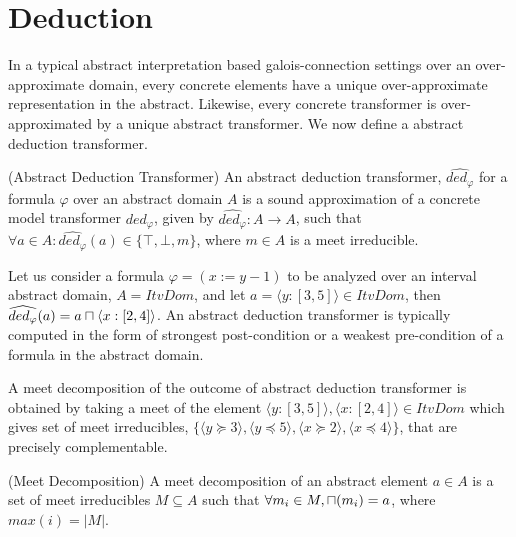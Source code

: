 \section{Deduction}
In a typical abstract interpretation based galois-connection settings over 
an over-approximate domain, every concrete elements have a unique over-approximate 
representation in the abstract.  Likewise, every concrete transformer is
over-approximated by a unique abstract transformer.  We now define a abstract 
deduction transformer.  

\begin{definition}{(Abstract Deduction Transformer)} An abstract deduction
transformer, $\widehat{ded_{\varphi}}$ for a formula $\varphi$ over an abstract 
domain $A$ is a sound approximation of a concrete model transformer
$ded_{\varphi}$, given by $\widehat{ded_{\varphi}} : A \rightarrow A$, such that 
$\forall a \in A: \widehat{ded_{\varphi}}(a) \in \{\top, \bot, m\}$, where 
$m \in A$ is a meet irreducible.   
\end{definition}

Let us consider a formula $\varphi = (x:=y-1)$ to be analyzed over 
an interval abstract domain, $A = ItvDom$, and let $a = \langle y:[3, 5]
\rangle \in ItvDom$, then $\widehat{ded_{\varphi}}(a) = a \sqcap \langle x:[2, 4]
\rangle$.  An abstract deduction transformer is typically computed in the form 
of strongest post-condition or a weakest pre-condition of a formula in the 
abstract domain.  

A meet decomposition of the outcome of abstract deduction transformer 
is obtained by taking a meet of the element $\langle y:[3, 5] \rangle, 
\langle x:[2, 4] \rangle \in ItvDom$ which gives set of meet irreducibles, 
$\{ \langle y \succeq 3 \rangle, \langle y \preceq 5 \rangle, 
\langle x \succeq 2 \rangle, \langle x \preceq 4 \rangle \}$, that are 
precisely complementable.

\begin{definition}{(Meet Decomposition)} A meet decomposition of an abstract
element $a \in A$ is a set of meet irreducibles $M \subseteq A$ such that 
$\forall m_i \in M, \sqcap(m_i) = a$, where $max(i) = |M|$.
\end{definition}
 
